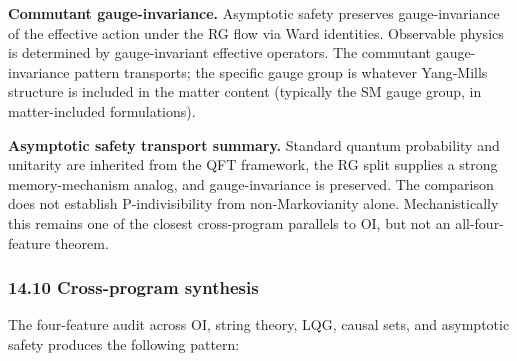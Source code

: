 \documentclass[
]{article}
\begin{document}
\textbf{Commutant gauge-invariance.} Asymptotic safety preserves
gauge-invariance of the effective action under the RG flow via Ward
identities. Observable physics is determined by gauge-invariant
effective operators. The commutant gauge-invariance pattern transports;
the specific gauge group is whatever Yang-Mills structure is included in
the matter content (typically the SM gauge group, in matter-included
formulations).

\textbf{Asymptotic safety transport summary.} Standard quantum
probability and unitarity are inherited from the QFT framework, the RG
split supplies a strong memory-mechanism analog, and gauge-invariance is
preserved. The comparison does not establish P-indivisibility from
non-Markovianity alone. Mechanistically this remains one of the closest
cross-program parallels to OI, but not an all-four-feature theorem.

\hypertarget{cross-program-synthesis}{%
\subsubsection{14.10 Cross-program
synthesis}\label{cross-program-synthesis}}

The four-feature audit across OI, string theory, LQG, causal sets, and
asymptotic safety produces the following pattern:
\end{document}
